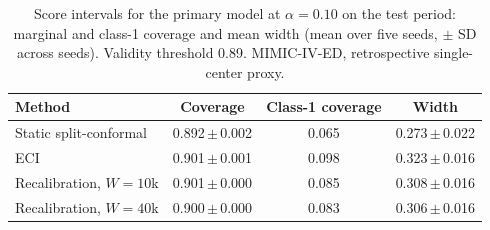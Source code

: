 \begin{table}[t]
\centering
\caption{Score intervals for the primary model at $\alpha = 0.10$ on the test period: marginal and class-1 coverage and mean width (mean over five seeds, $\pm$ SD across seeds). Validity threshold 0.89. MIMIC-IV-ED, retrospective single-center proxy.}
\label{tab:intervals}
\begin{tabular}{lccc}
\toprule
Method & Coverage & Class-1 coverage & Width \\
\midrule
Static split-conformal & 0.892\,$\pm$\,0.002 & 0.065 & 0.273\,$\pm$\,0.022 \\
ECI & 0.901\,$\pm$\,0.001 & 0.098 & 0.323\,$\pm$\,0.016 \\
Recalibration, $W = 10$k & 0.901\,$\pm$\,0.000 & 0.085 & 0.308\,$\pm$\,0.016 \\
Recalibration, $W = 40$k & 0.900\,$\pm$\,0.000 & 0.083 & 0.306\,$\pm$\,0.016 \\
\bottomrule
\end{tabular}
\end{table}
